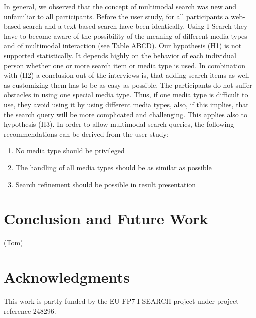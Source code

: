 \documentclass[runningheads,a4paper]{llncs} \usepackage[utf8]{inputenc}
\begin{document}
In general, we observed that the concept of multimodal search was new and
unfamiliar to all participants. Before the user study, for all participants a
web-based search and a text-based search have been identically. Using I-Search
they have to become aware of the possibility of the meaning of different media
types and of multimodal interaction (see Table ABCD). Our hypothesis (H1) is not
supported statistically. It depends highly on the behavior of each individual
person whether one or more search item or media type is used. In combination
with (H2) a conclusion out of the interviews is, that adding search items as
well as customizing them has to be as easy as possible. The participants do not
suffer obstacles in using one special media type. Thus, if one media type is
difficult to use, they avoid using it by using different media types, also, if
this implies, that the search query will be more complicated and challenging.
This applies also to hypothesis (H3). In order to allow multimodal search
queries, the following recommendations can be derived from the user study: 

\begin{enumerate}
  \item No media type should be privileged
  \item The handling of all media types should be as similar as possible
  \item Search refinement should be possible in result presentation  
\end{enumerate}

\section{Conclusion and Future Work}
(Tom)

\section{Acknowledgments}
This work is partly funded by the EU FP7 \mbox{I-SEARCH} project under project reference 248296.



\end{document}
